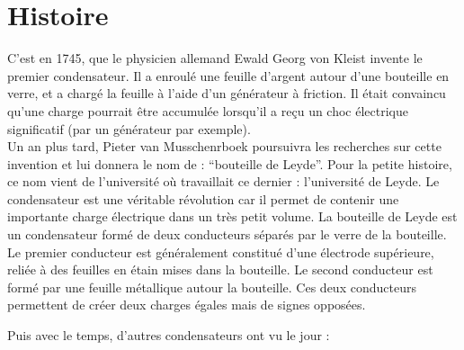 
\chapter{Histoire} 

C’est en 1745, que le physicien allemand Ewald Georg von Kleist invente le premier condensateur. Il a enroulé une feuille d'argent autour d'une bouteille en verre,  et  a  chargé  la  feuille  à  l'aide  d'un  générateur  à  friction. Il était convaincu  qu'une  charge  pourrait  être  accumulée  lorsqu'il  a  reçu  un  choc  électrique  significatif (par un générateur par exemple). \\

Un an plus tard, Pieter van Musschenrboek poursuivra les recherches sur cette invention et lui donnera le nom de : “bouteille de Leyde”. Pour la petite histoire, ce nom vient de l’université où travaillait ce dernier : l’université de Leyde. Le condensateur est une véritable révolution car il permet de contenir une importante charge électrique dans un très petit volume.  La bouteille de Leyde est un condensateur formé de deux conducteurs séparés par le verre de la bouteille. Le premier conducteur est généralement constitué d'une électrode supérieure, reliée à des feuilles en étain mises dans  la  bouteille.  Le  second  conducteur  est  formé  par  une feuille  métallique  autour la  bouteille. Ces deux conducteurs permettent de créer deux charges égales mais de signes opposées. \\



Puis avec le temps, d'autres condensateurs ont vu le jour : 

